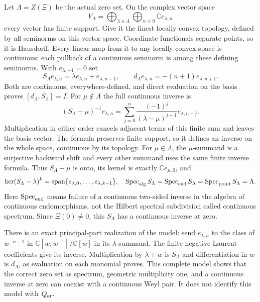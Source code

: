 Let $\Lambda=Z(\Xi)$ be the actual zero set. On the complex
vector space
\[
 V_\Lambda=\bigoplus_{\lambda\in\Lambda}
                   \bigoplus_{n\geq0}\mathbb C e_{\lambda,n}
\]
every vector has finite support. Give it the finest locally
convex topology, defined by all seminorms on this vector space.
Coordinate functionals separate points, so it is Hausdorff.
Every linear map from it to any locally convex space is
continuous: each pullback of a continuous seminorm is among
these defining seminorms.
With $e_{\lambda,-1}=0$ set
\[
 S_\Lambda e_{\lambda,n}=\lambda e_{\lambda,n}+e_{\lambda,n-1},
 \qquad d_\Lambda e_{\lambda,n}=-(n+1)e_{\lambda,n+1}.
\]
Both are continuous, everywhere-defined, and direct evaluation
on the basis proves $[d_\Lambda,S_\Lambda]=I$.
For $\mu\notin\Lambda$ the full continuous inverse is
\begin{equation}
 (S_\Lambda-\mu)^{-1}e_{\lambda,n}
 =\sum_{j=0}^n
       \frac{(-1)^j}{(\lambda-\mu)^{j+1}}e_{\lambda,n-j}.
 \label{csq:eq-source-model-resolvent}
\end{equation}
Multiplication in either order cancels adjacent terms of
this finite sum and leaves the basis vector. The formula
preserves finite support, so it defines an inverse on
the whole space, continuous by its topology.
For $\mu\in\Lambda$, the $\mu$-summand is a surjective
backward shift and every other summand uses the same finite
inverse formula. Thus $S_\Lambda-\mu$ is onto, its kernel
is exactly $\mathbb C e_{\mu,0}$, and
\begin{equation}
 \ker(S_\Lambda-\lambda)^k
   =\operatorname{span}\{e_{\lambda,0},\ldots,e_{\lambda,k-1}\},
 \quad
 \operatorname{Spec}_{\rm alg}S_\Lambda
  =\operatorname{Spec}_{\rm end}S_\Lambda
  =\operatorname{Spec}_{\rm point}S_\Lambda=\Lambda .
 \label{csq:eq-source-model-spectrum}
\end{equation}
Here $\operatorname{Spec}_{\rm end}$ means failure of a
continuous two-sided inverse in the algebra of continuous
endomorphisms, not the Hilbert spectral subdivision called
continuous spectrum. Since $\Xi(0)\ne0$, this $S_\Lambda$
has a continuous inverse at zero.

There is an exact principal-part realization of the model:
send $e_{\lambda,n}$ to the class of $w^{-n-1}$ in
$\mathbb C[w,w^{-1}]/\mathbb C[w]$ in its $\lambda$-summand.
The finite negative Laurent coefficients give its inverse.
Multiplication by $\lambda+w$ is $S_\Lambda$ and
differentiation in $w$ is $d_\Lambda$, as evaluation on
each monomial proves.
This complete model shows that the correct zero set as
spectrum, geometric multiplicity one, and a continuous
inverse at zero can coexist with a continuous Weyl pair.
It does not identify this model with $Q_{\rm ar}$.

